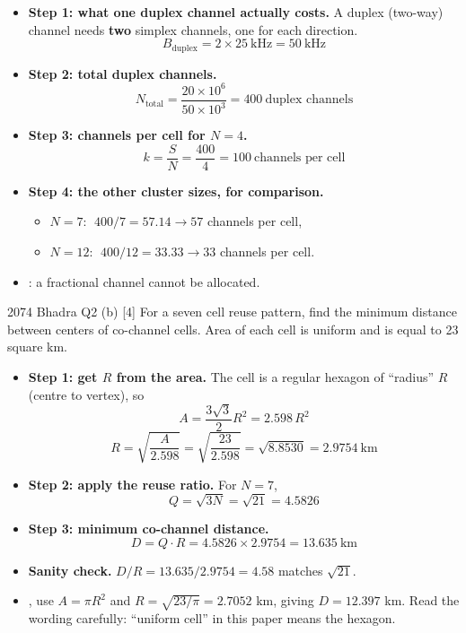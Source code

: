 \begin{itemize}
  \item \textbf{Step 1: what one duplex channel actually costs.}
        A duplex (two-way) channel needs \textbf{two} simplex channels, one for each direction.
        \[ B_{\text{duplex}} = 2 \times 25\ \text{kHz} = 50\ \text{kHz} \]
  \item \textbf{Step 2: total duplex channels.}
        \[ N_{\text{total}} = \frac{20 \times 10^{6}}{50 \times 10^{3}}
           = \boxed{400\ \text{duplex channels}} \]
  \item \textbf{Step 3: channels per cell for $N = 4$.}
        \[ k = \frac{S}{N} = \frac{400}{4} = \boxed{100\ \text{channels per cell}} \]
  \item \textbf{Step 4: the other cluster sizes, for comparison.}
  \begin{itemize}
    \item $N = 7$: $\;400/7 = 57.14 \rightarrow 57$ channels per cell,
    \item $N = 12$: $\;400/12 = 33.33 \rightarrow 33$ channels per cell.
  \end{itemize}
  \item {}: a fractional channel cannot be allocated.
\end{itemize}

\hr

{\color{sub}\footnotesize {} }

\begin{asked}{2074 Bhadra \textperiodcentered{} Q2 (b) \textperiodcentered{} [4]}
For a seven cell reuse pattern, find the minimum distance between centers of co-channel cells.
Area of each cell is uniform and is equal to 23 square km.
\end{asked}

\begin{itemize}
  \item \textbf{Step 1: get $R$ from the area.} The cell is a regular hexagon of
        ``radius'' $R$ (centre to vertex), so
        \[ A = \frac{3\sqrt{3}}{2}R^2 = 2.598\,R^2 \]
        \[ R = \sqrt{\frac{A}{2.598}} = \sqrt{\frac{23}{2.598}} = \sqrt{8.8530}
             = 2.9754\ \text{km} \]
  \item \textbf{Step 2: apply the reuse ratio.} For $N = 7$,
        \[ Q = \sqrt{3N} = \sqrt{21} = 4.5826 \]
  \item \textbf{Step 3: minimum co-channel distance.}
        \[ D = Q \cdot R = 4.5826 \times 2.9754 = \boxed{13.635\ \text{km}} \]
  \item \textbf{Sanity check.} $D/R = 13.635/2.9754 = 4.58$ \checkmark matches $\sqrt{21}$.
  \item {}, use $A = \pi R^2$ and
        $R = \sqrt{23/\pi} = 2.7052$ km, giving $D = 12.397$ km. Read the wording carefully:
        ``uniform cell'' in this paper means the hexagon.
\end{itemize}

